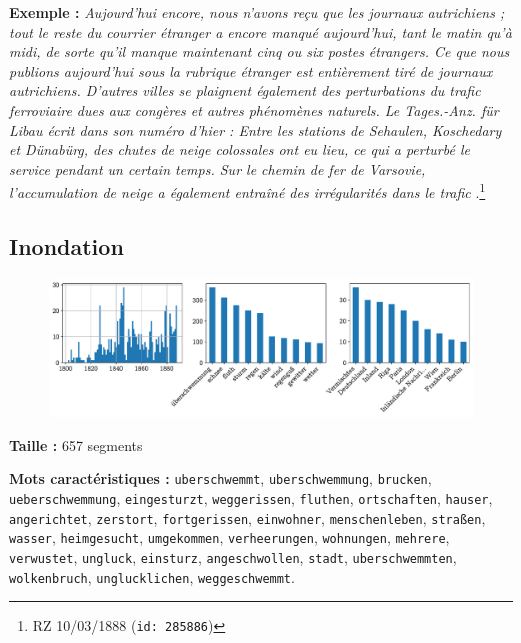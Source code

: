 \documentclass[a4paper,twoside,12pt]{article}
\begin{document}
\noindent \textbf{Exemple :} \textit{Aujourd'hui encore, nous n'avons reçu que les journaux autrichiens ; tout le reste du courrier étranger a encore manqué aujourd'hui, tant le matin qu'à midi, de sorte qu'il manque maintenant cinq ou six postes étrangers. Ce que nous publions aujourd'hui sous la rubrique \og étranger \fg{} est entièrement tiré de journaux autrichiens. D'autres villes se plaignent également des perturbations du trafic ferroviaire dues aux congères et autres phénomènes naturels. Le \og Tages.-Anz. für Libau \fg{} écrit dans son numéro d'hier : \og Entre les stations de Sehaulen, Koschedary et Dünabürg, des chutes de neige colossales ont eu lieu, ce qui a perturbé le service pendant un certain temps. Sur le chemin de fer de Varsovie, l'accumulation de neige a également entraîné des irrégularités dans le trafic \fg{}}.\footnote{RZ 10/03/1888 (\texttt{id: 285886})}




\subsection{Inondation} \label{topic9_inondation}

\begin{figure}[H]
\centering
\includegraphics[width=\textwidth]{images/topic_charts_9.pdf}
\end{figure}

\begin{flushleft}
\textbf{Taille :} 657 segments

\textbf{Mots caractéristiques :} \texttt{uberschwemmt}, \texttt{uberschwemmung}, \texttt{brucken}, \texttt{ueberschwemmung}, \texttt{eingesturzt}, \texttt{weggerissen}, \texttt{fluthen}, \texttt{ortschaften}, \texttt{hauser}, \texttt{angerichtet}, \texttt{zerstort}, \texttt{fortgerissen}, \texttt{einwohner}, \texttt{menschenleben}, \texttt{straßen}, \texttt{wasser}, \texttt{heimgesucht}, \texttt{umgekommen}, \texttt{verheerungen}, \texttt{wohnungen}, \texttt{mehrere}, \texttt{verwustet}, \texttt{ungluck}, \texttt{einsturz}, \texttt{angeschwollen}, \texttt{stadt}, \texttt{uberschwemmten}, \texttt{wolkenbruch}, \texttt{unglucklichen}, \texttt{weggeschwemmt}.
\end{flushleft}
\end{document}

